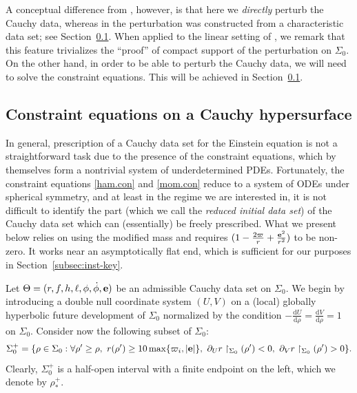 \documentclass[10pt, reqno]{amsart}
\theoremstyle{definition}
\theoremstyle{remark}
\theoremstyle{conjecture}
\numberwithin{equation}{section}
\newcommand{\abs}[1]{\vert#1\vert}
\newcommand{\set}[1]{\{#1\}}
\newcommand{\ud}{\mathrm{d}}
\newcommand{\rd}{\partial}
\newcommand{\0}{\emptyset}
\newcommand{\Sgm}{\Sigma}
\newcommand{\Tht}{\Theta}
\newcommand{\bfe}{{\bf e}}
\newcommand{\f}{\frac}
\newcommand{\e}{\bfe}							%
\begin{document}
A conceptual difference from \cite[Proof of Theorem~1.5]{LO.instab}, however, is that here we \emph{directly} perturb the Cauchy data, whereas in \cite{LO.instab} the perturbation was constructed from a characteristic data set; see Section~\ref{subsec:const-eq}. When applied to the linear setting of \cite{LO.instab}, we remark that this feature trivializes the ``proof'' of compact support of the perturbation on $\Sgm_{0}$. On the other hand, in order to be able to perturb the Cauchy data, we will need to solve the constraint equations. This will be achieved in Section~\ref{subsec:const-eq}.


\subsection{Constraint equations on a Cauchy hypersurface} \label{subsec:const-eq}
In general, prescription of a Cauchy data set for the Einstein equation is not a straightforward task due to the presence of the constraint equations, which by themselves form a nontrivial system of underdetermined PDEs. Fortunately, the constraint equations \eqref{ham.con} and \eqref{mom.con} reduce to a system of ODEs under spherical symmetry, and at least in the regime we are interested in, it is not difficult to identify the part (which we call the \emph{reduced initial data set}) of the Cauchy data set which can (essentially) be freely prescribed. What we present below relies on using the modified mass and requires $(1-\f{2\varpi}{r}+\f{\e^2}{r^2})$ to be non-zero. It works near an asymptotically flat end, which is sufficient for our purposes in Section~\ref{subsec:inst-key}.

Let $\Tht = (r, f, h, \ell, \phi, \dot{\phi}, \e)$ be an admissible Cauchy data set on $\Sgm_{0}$. We begin by introducing a double null coordinate system $(U, V)$ on a (local) globally hyperbolic future development of $\Sgm_{0}$ normalized by the condition $- \frac{\ud U}{\ud \rho} = \frac{\ud V}{\ud \rho} = 1$ on $\Sgm_{0}$. Consider now the following subset of $\Sgm_{0}$:
\begin{equation*}
\Sgm_{0}^{+} = \set{\rho \in \Sgm_{0} : \forall \rho' \geq \rho, \ r(\rho') \geq 10 \max\set{\varpi_{i}, \abs{\e}}, \ \rd_{U} r \restriction_{\Sgm_{0}}(\rho') < 0, \  \rd_{V} r \restriction_{\Sgm_{0}}(\rho') > 0}.
\end{equation*}
Clearly, $\Sgm_{0}^{+}$ is a half-open interval with a finite endpoint on the left, which we denote by $\rho_{\ast}^{+}$. 
\end{document}
